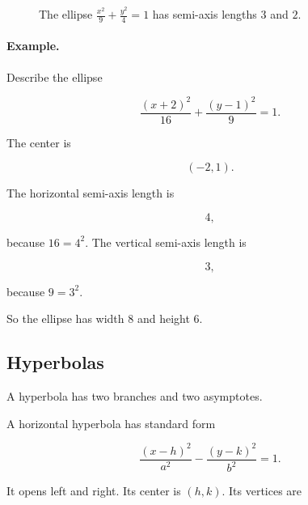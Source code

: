 \begin{figure}[h]
\centering
{}
\caption{The ellipse \(\frac{x^2}{9}+\frac{y^2}{4}=1\) has semi-axis lengths \(3\) and \(2\).}
\label{fig:appendix-ellipse-standard}
\end{figure}

\paragraph{Example.}
Describe the ellipse

\[
\frac{(x+2)^2}{16}+\frac{(y-1)^2}{9}=1.
\]

The center is

\[
(-2,1).
\]

The horizontal semi-axis length is

\[
4,
\]

because \(16=4^2\).  The vertical semi-axis length is

\[
3,
\]

because \(9=3^2\).

So the ellipse has width \(8\) and height \(6\).

\subsection{Hyperbolas}
\label{appsubsec:hyperbolas}

A hyperbola has two branches and two asymptotes.

A horizontal hyperbola has standard form

\[
\boxed{
\frac{(x-h)^2}{a^2}-\frac{(y-k)^2}{b^2}=1.
}
\]

It opens left and right.  Its center is \((h,k)\).  Its vertices are


